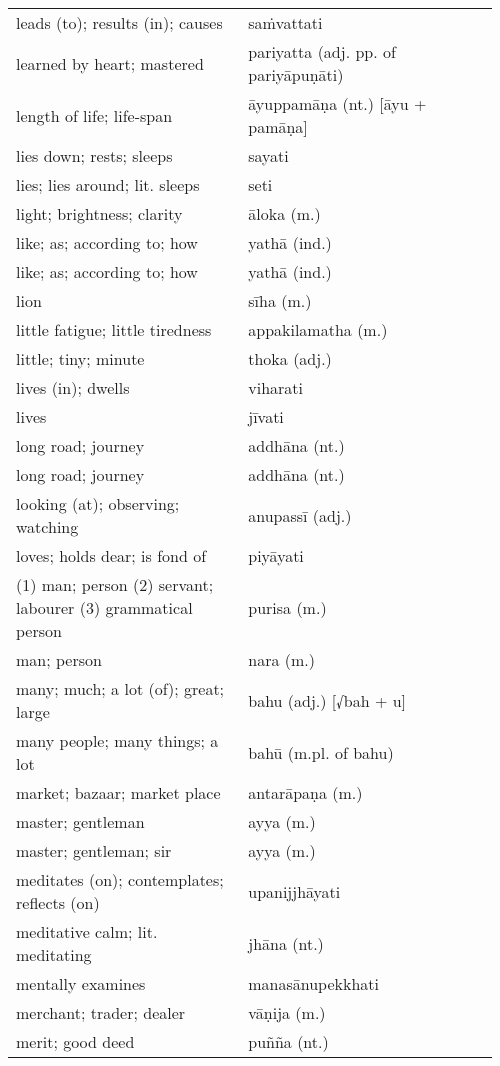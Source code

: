 \documentclass[a5paper]{memoir}
\begin{document}
\begin{longtable}{L{0.48\linewidth} L{0.48\linewidth} H}
leads (to); results (in); causes & saṁvattati & \\[0pt]
learned by heart; mastered & pariyatta (adj. pp. of pariyāpuṇāti) & \\[0pt]
length of life; life-span & āyuppamāṇa (nt.) [āyu + pamāṇa] & \\[0pt]
lies down; rests; sleeps & sayati & \\[0pt]
lies; lies around; lit. sleeps & seti & \\[0pt]
light; brightness; clarity & āloka (m.) & \\[0pt]
like; as; according to; how & yathā (ind.) & \\[0pt]
like; as; according to; how & yathā (ind.) & \\[0pt]
lion & sīha (m.) & \\[0pt]
little fatigue; little tiredness & appakilamatha (m.) & \\[0pt]
little; tiny; minute & thoka (adj.) & \\[0pt]
lives (in); dwells & viharati & \\[0pt]
lives & jīvati & \\[0pt]
long road; journey & addhāna (nt.) & \\[0pt]
long road; journey & addhāna (nt.) & \\[0pt]
looking (at); observing; watching & anupassī (adj.) & \\[0pt]
loves; holds dear; is fond of & piyāyati & \\[0pt]
(1) man; person (2) servant; labourer (3) grammatical person & purisa (m.) & \\[0pt]
man; person & nara (m.) & \\[0pt]
many; much; a lot (of); great; large & bahu (adj.) [√bah + u] & \\[0pt]
many people; many things; a lot & bahū (m.pl. of bahu) & \\[0pt]
market; bazaar; market place & antarāpaṇa (m.) & \\[0pt]
master; gentleman & ayya (m.) & \\[0pt]
master; gentleman; sir & ayya (m.) & \\[0pt]
meditates (on); contemplates; reflects (on) & upanijjhāyati & \\[0pt]
meditative calm; lit. meditating & jhāna (nt.) & \\[0pt]
mentally examines & manasānupekkhati & \\[0pt]
merchant; trader; dealer & vāṇija (m.) & \\[0pt]
merit; good deed & puñña (nt.) & \\[0pt]

\end{longtable}
\end{document}
